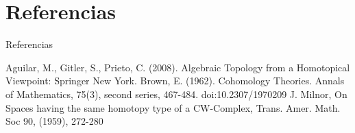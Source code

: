 \documentclass{beamer}
\begin{document}
\section{Referencias}
\begin{frame}{Referencias}
\begin{thebibliography}{} 

 Aguilar, M., Gitler, S., Prieto, C. (2008). Algebraic Topology from a Homotopical Viewpoint: Springer New York.
 Brown, E. (1962). Cohomology Theories. Annals of Mathematics, 75(3), second series, 467-484. doi:10.2307/1970209
 J. Milnor, On Spaces having the same homotopy type of a CW-Complex, Trans. Amer. Math. Soc 90, (1959), 272-280
\end{thebibliography}
\end{frame}
\end{document}
